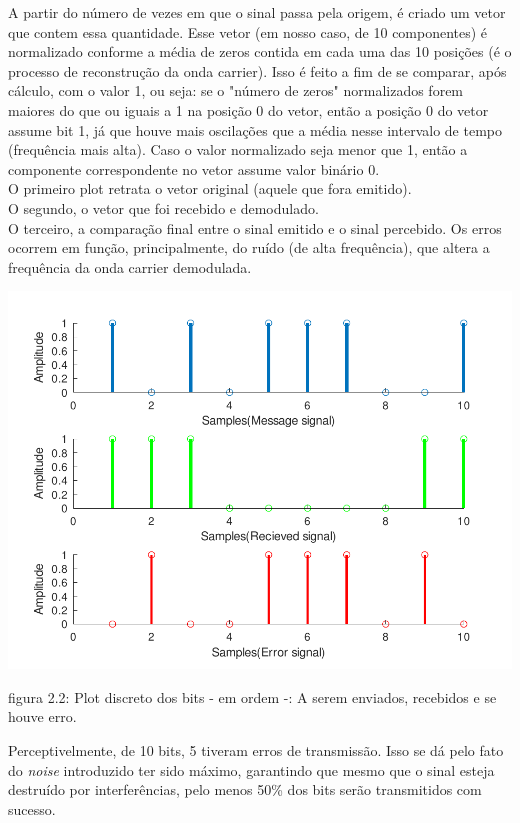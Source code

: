 \documentclass[11pt,a4paper]{report}
\begin{document}
		A partir do número de vezes em que o sinal passa pela origem, é criado um vetor que contem essa quantidade. Esse vetor (em nosso caso, de 10 componentes) é normalizado conforme a média de zeros contida em cada uma das 10 posições (é o processo de reconstrução da onda carrier). Isso é feito a fim de se comparar, após cálculo, com o valor 1, ou seja: se o "número de zeros" normalizados forem maiores do que ou iguais a 1 na posição 0 do vetor, então a posição 0 do vetor assume bit 1, já que houve mais oscilações que a média nesse intervalo de tempo (frequência mais alta). Caso o valor normalizado seja menor que 1, então a componente correspondente no vetor assume valor binário 0.\\
		
		O primeiro plot retrata o vetor original (aquele que fora emitido).\\
		
		O segundo, o vetor que foi recebido e demodulado.\\
		
		O terceiro, a comparação final entre o sinal emitido e o sinal percebido. Os erros ocorrem em função, principalmente, do ruído (de alta frequência), que altera a frequência da onda carrier demodulada.
		
\begin{center}
	\includegraphics[clip, trim=0.0cm 0cm 0.0cm 0.0cm, 								width=1.00\textwidth]{sinais_comp}
\end{center}
\begin{center}
	{\footnotesize figura 2.2: Plot discreto dos bits - em ordem -: A serem enviados, recebidos e se houve erro.}
\end{center}
	Perceptivelmente, de 10 bits, 5 tiveram erros de transmissão. Isso se dá pelo fato do {\it noise} introduzido ter sido máximo, garantindo que mesmo que o sinal esteja destruído por interferências, pelo menos 50\% dos bits serão transmitidos com sucesso.\\
		
\end{document}
